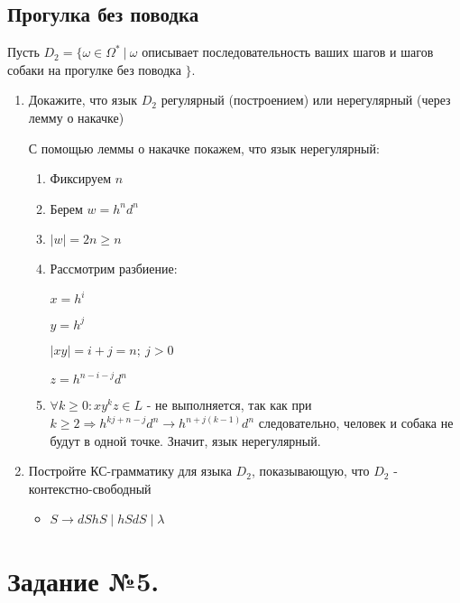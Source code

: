 \documentclass[a4paper,12pt]{article}
\begin{document}
    \subsection{Прогулка без поводка}
 
        Пусть $D_2 = \{\omega \in \Omega^* \: | \: \omega$ описывает последовательность ваших шагов и шагов собаки на прогулке без поводка $\}$.
 
        \begin{enumerate}
            \item Докажите, что язык $D_2$ регулярный (построением) или нерегулярный (через лемму о накачке)
 
            С помощью леммы о накачке покажем, что язык нерегулярный:
            \begin{enumerate}
                \item Фиксируем $n$
                \item Берем $w = h^n d^n$
                \item $|w| = 2n \geq n$
                \item Рассмотрим разбиение:
 
                $x = h^i$
 
                $y = h^j$
 
                $|xy| = i + j = n; \: j > 0$
 
                $z = h^{n-i-j}d^n$
 
                \item $\forall k \geq 0: xy^kz \in L$ - не выполняется, так как при $k \geq 2 \Rightarrow h^{kj+n-j}d^n \rightarrow h^{n+j(k-1)}d^n$ следовательно, человек и собака не будут в одной точке. Значит, язык нерегулярный.
            \end{enumerate}
 
            \item Постройте КС-грамматику для языка $D_2$, показывающую, что $D_2$ - контекстно-свободный
 
                \begin{itemize}
                    \item $S \to dShS \; | \; hSdS \; | \; \lambda$
                \end{itemize}
 
 
        \end{enumerate}
  
\section{Задание №5.}
\end{document}
